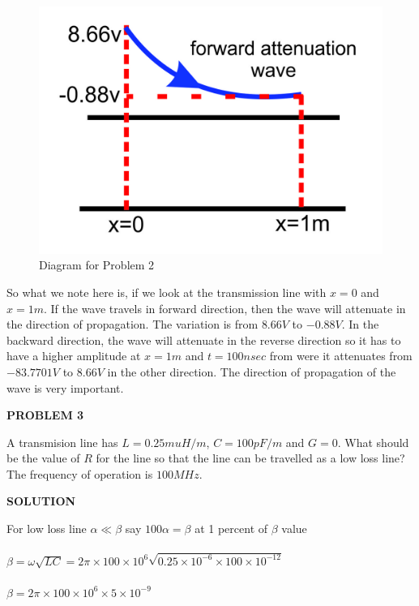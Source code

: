 \begin{figure}[h!]
\centering
\includegraphics[scale=0.5]{./graphics/Group98}
\caption{Diagram for Problem 2}
\end{figure}
So what we note here is, if we look at the transmission line with ${x=0}$ and ${x=1m}$. If the wave travels in forward direction, then the wave will attenuate in the direction of propagation. The variation is from ${8.66V}$ to ${-0.88V}$. In the backward direction, the wave will attenuate in the reverse direction so it has to  have a higher amplitude at ${x=1m}$ and ${t=100nsec}$ from were it attenuates from ${-83.7701V}$ to ${8.66V}$ in the other direction. The direction of propagation of the wave is very important.\\
\begin{center}
\textbf{PROBLEM 3}
\end{center}
A transmision line has $L = 0.25muH/m$, $C=100pF/m$ and ${G=0}$. What should be the value of ${R}$ for the line so that the line can be travelled as a low loss line? The frequency of operation is ${100MHz}$.\\
\begin{center}
\textbf{SOLUTION}
\end{center}
For low loss line ${\alpha\ll\beta}$ say ${100\alpha=\beta}$ at 1 percent of ${\beta}$ value\\\\
${\beta=\omega\sqrt{LC}} = {2\pi\times100\times10^6\sqrt{0.25\times10^{-6}\times100\times10^{-12}}}$\\\\
${\beta=2\pi\times100\times10^6\times5\times10^{-9}}$\\\\
